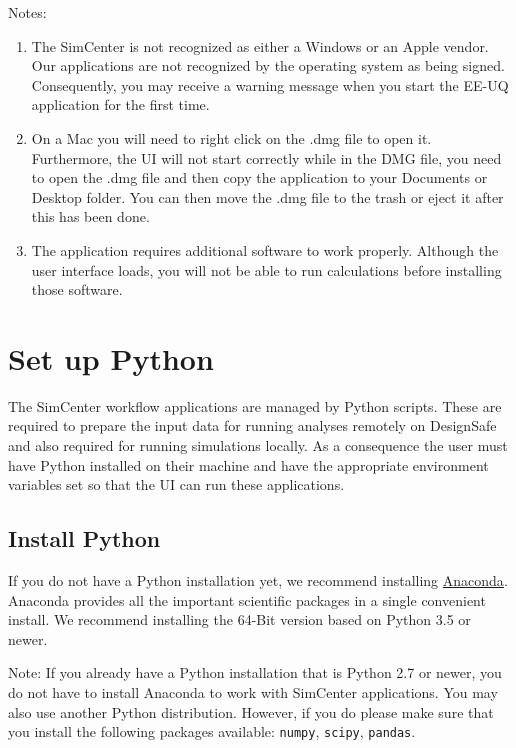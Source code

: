 Notes:
\begin{enumerate}
\item The SimCenter is not recognized as either a Windows or an Apple vendor. Our applications are not recognized by the operating system as being signed. Consequently, you may receive a warning message when you start the EE-UQ application for the first time.
\item  On a Mac you will need to right click on the .dmg file to open it. Furthermore, the UI will not start correctly while in the DMG file, you need to open the .dmg file and then copy the \texttt{\getsoftwarename{}} application to your Documents or Desktop folder. You can then move the .dmg file to the trash or eject it after this has been done.
\item  The \texttt{\getsoftwarename{}} application requires additional software to work properly. Although the user interface loads, you will not be able to run calculations before installing those software.
\end{enumerate}



\section{Set up Python}

The SimCenter workflow applications are managed by Python
scripts. These are required to prepare the input data for running
analyses remotely on DesignSafe and also required for running
simulations locally. As a consequence the user must have Python
installed on their machine and have the appropriate environment
variables set so that the UI can run these applications.

\subsection{Install Python}

If you do not have a Python installation yet, we recommend
installing \href{http://www.anaconda.com/distribution/#download-section}{Anaconda}. Anaconda
provides all the important scientific packages in a single convenient
install. We recommend installing the 64-Bit version based on Python
3.5 or newer.

Note: If you already have a Python installation that is Python 2.7 or
newer, you do not have to install Anaconda to work with SimCenter
applications. You may also use another Python distribution. However,
if you do please make sure that you install the following packages
available: \texttt{numpy}, \texttt{scipy}, \texttt{pandas}.


